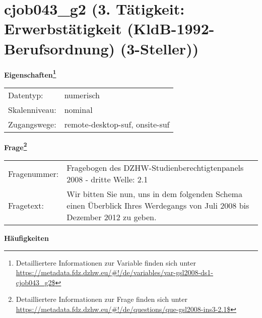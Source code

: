 
    \setcounter{footnote}{0}

    \vspace*{-1.8cm}
	\section{cjob043\_g2 (3. Tätigkeit: Erwerbstätigkeit (KldB-1992-Berufsordnung) (3-Steller))}
	\label{section:cjob043_g2}



    \vspace*{0.5cm}
    \noindent\textbf{Eigenschaften\footnote{Detailliertere Informationen zur Variable finden sich unter
		\url{https://metadata.fdz.dzhw.eu/\#!/de/variables/var-gsl2008-ds1-cjob043_g2$}}}\\
	\begin{tabularx}{\hsize}{@{}lX}
	Datentyp: & numerisch \\
	Skalenniveau: & nominal \\
	Zugangswege: &
	  remote-desktop-suf, 
	  onsite-suf
 \\
    \end{tabularx}



				\vspace*{0.5cm}
                \noindent\textbf{Frage\footnote{Detailliertere Informationen zur Frage finden sich unter
		              \url{https://metadata.fdz.dzhw.eu/\#!/de/questions/que-gsl2008-ins3-2.1$}}}\\
				\begin{tabularx}{\hsize}{@{}lX}
					Fragenummer: &
					  Fragebogen des DZHW-Studienberechtigtenpanels 2008 - dritte Welle:
					  2.1
 \\
					Fragetext: & Wir bitten Sie nun, uns in dem folgenden Schema einen Überblick Ihres Werdegangs von Juli 2008 bis Dezember 2012 zu geben. \\
				\end{tabularx}





        		\vspace*{0.5cm}
                \noindent\textbf{Häufigkeiten}

